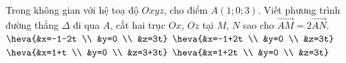 \begin{ex}%
	Trong  không gian với hệ toạ độ $Oxyz$, cho điểm $A(1;0;3)$. Viết phương trình đường thẳng $\Delta$ đi qua $A$, cắt hai trục $Ox$, $Oz$ tại $M$, $N$ sao cho $\overrightarrow{AM}=2\overrightarrow{AN}$.
	\choice 
		 {$\heva{&x=-1-2t \\ &y=0 \\ &z=3t}$}
		{\True $\heva{&x=-1+2t  \\ &y=0 \\ &z=3t}$}
		{$\heva{&x=1+t  \\ &y=0 \\ &z=3+3t}$}
		{$\heva{&x=1+2t \\ &y=0 \\  &z=3t}$}
\end{ex}

